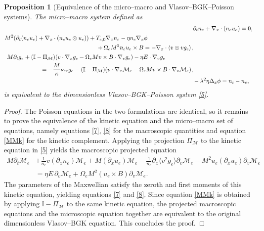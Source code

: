 \documentclass[pdflatex,final,10pt]{article}
\newtheorem{proposition}{Proposition}[section]
\newcommand{\Fabrice}[1]{#1}
\newcommand{\Del}[1]{#1}
\begin{document}
\begin{proposition}[\Del{Equivalence of the micro–macro and Vlasov–BGK–Poisson systems}]\label{prop:equivalence}
The micro--macro system defined as 
\begin{align}
    &\partial_{t}{n_e}+\nabla_{x}\cdot(n_e u_e)=0,\label{MMd}\\
    \begin{split}
    &M^{2}(\partial_{t}(n_e u_e)+\nabla_{x}\cdot(n_e u_e\otimes u_e))+T_{e,0}\nabla_{x}n_e-
    \eta n_e\nabla_{x}\phi\\
    &\hspace{5.5cm}+\Omega_{e}M^{2}n_e u_e\times B = -\nabla_{x}\cdot\langle v\otimes vg_{e}\rangle,
    \end{split}\label{MMm}\\
    \begin{split}
    &M\partial_t{g_e}+(\mathbb{I}-\Pi_{\mathcal{M}})(v\cdot\nabla_xg_e-\Omega_eMv\times B\cdot\nabla_vg_e)-\eta E\cdot\nabla_vg_e \\
    &\hspace{2cm}=-\frac{M}{\kappa}\nu_{ee}g_e-(\mathbb{I}-\Pi_{\mathcal{M}})(v\cdot\nabla_x\mathcal{M}_{e}-\Omega_eMv\times B\cdot\nabla_v\mathcal{M}_{e}),
    \end{split}\label{MMk}\\
    &-\lambda^{2}\eta\Delta_{x}\phi=n_{i}-n_e,\label{MMp}
\end{align}
is equivalent to the dimensionless Vlasov--BGK--Poisson system \eqref{5}.
\end{proposition}
\begin{proof}
The Poisson equations in the two formulations are identical, so it remains to prove the equivalence of the kinetic equation and the micro--macro \Fabrice{set of equations, namely equations \eqref{7}, \eqref{8} for the macroscopic quantities and equation \eqref{MMk} for the kinetic complement}. Applying the projection $\Pi_{\mathcal{M}}$ to the kinetic equation in \eqref{5} yields the macroscopic projected equation
\begin{equation*}
        \begin{split}
            M\partial_t\mathcal{M}_e&+\frac{1}{n_e}v(\partial_xn_e)\mathcal{M}_e+M(\partial_xu_e)\mathcal{M}_e-\frac{1}{n_e}\partial_x\langle v^2g_e\rangle\partial_v\mathcal{M}_e-M^2u_e(\partial_xu_e)\partial_v\mathcal{M}_e\\
            &=\eta E\,\partial_v\mathcal{M}_e+\Omega_eM^2(u_e\times B)\partial_v\mathcal{M}_e.
        \end{split}
\end{equation*}
\Fabrice{The parameters of the Maxwellian satisfy the zeroth and first moments of this kinetic equation, yielding equations} \eqref{7} and \eqref{8}. Since equation \eqref{MMk} is obtained by applying $\mathbb{I}-\Pi_{\mathcal{M}}$ to the same kinetic equation, the projected macroscopic equations and the microscopic equation together are equivalent to the original dimensionless Vlasov--BGK equation. This \Fabrice{concludes the proof}.
\end{proof}
\end{document}
